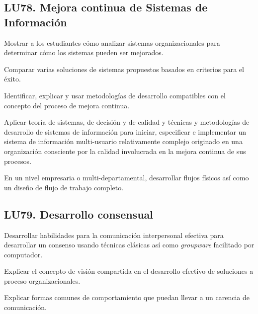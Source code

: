 \subsection{LU78. Mejora continua de Sistemas de Información}\label{sec:BOK-LU78}\label{sec:LU78}
\begin{LearningUnit}
\begin{LUGoal}
\item Mostrar a los estudiantes cómo analizar sistemas organizacionales para determinar cómo los sistemas pueden ser mejorados.
\end{LUGoal}

\begin{LUObjective}
\item Comparar varias soluciones de sistemas propuestos basados en criterios para el éxito.
\item Identificar, explicar y usar metodologías de desarrollo compatibles con el concepto del proceso de mejora continua.
\item Aplicar teoría de sistemas, de decisión y de calidad y técnicas y metodologías de desarrollo de sistemas de información para iniciar, especificar e implementar un sistema de información multi-usuario relativamente complejo originado en una organización consciente por la calidad involucrada en la mejora continua de sus procesos.
\item En un nivel empresaria o multi-departamental, desarrollar flujos físicos así como un diseño de flujo de trabajo completo.
\end{LUObjective}
\end{LearningUnit}

\subsection{LU79. Desarrollo consensual}\label{sec:BOK-LU79}\label{sec:LU79}
\begin{LearningUnit}
\begin{LUGoal}
\item Desarrollar habilidades para la comunicación interpersonal efectiva para desarrollar un consenso usando técnicas clásicas así como \textit{groupware} facilitado por computador.
\end{LUGoal}

\begin{LUObjective}
\item Explicar el concepto de visión compartida en el desarrollo efectivo de soluciones a proceso organizacionales.
\item Explicar formas comunes de comportamiento que puedan llevar a un carencia de comunicación.
\end{LUObjective}
\end{LearningUnit}

